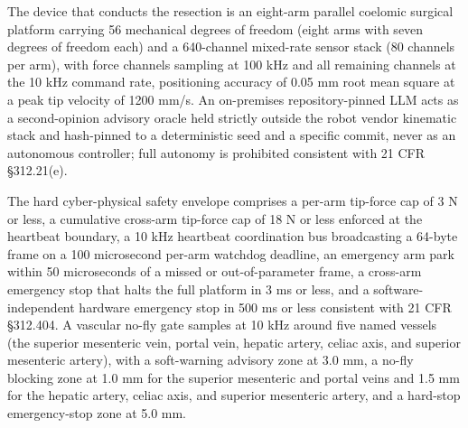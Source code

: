 The device that conducts the resection is an eight-arm parallel coelomic surgical
platform carrying 56 mechanical degrees of freedom (eight arms with seven
degrees of freedom each) and a 640-channel mixed-rate sensor stack (80 channels per
arm), with force channels sampling at 100 kHz and all remaining channels at the
10 kHz command rate, positioning accuracy of 0.05 mm root mean square at a peak tip
velocity of 1200 mm/s. An on-premises repository-pinned LLM acts as a second-opinion
advisory oracle held strictly outside the robot vendor kinematic stack and hash-pinned
to a deterministic seed and a specific commit, never as an autonomous controller;
full autonomy is prohibited consistent with 21 CFR \S 312.21(e). 

The hard
cyber-physical safety envelope comprises a per-arm tip-force cap of 3 N or less, a
cumulative cross-arm tip-force cap of 18 N or less enforced at the heartbeat
boundary, a 10 kHz heartbeat coordination bus broadcasting a 64-byte frame on a 100
microsecond per-arm watchdog deadline, an emergency arm park within 50 microseconds
of a missed or out-of-parameter frame, a cross-arm emergency stop that halts the
full platform in 3 ms or less, and a software-independent hardware emergency stop in
500 ms or less consistent with 21 CFR \S 312.404. A vascular no-fly gate samples at
10 kHz around five named vessels (the superior mesenteric vein, portal vein, hepatic
artery, celiac axis, and superior mesenteric artery), with a soft-warning advisory
zone at 3.0 mm, a no-fly blocking zone at 1.0 mm for the superior mesenteric and
portal veins and 1.5 mm for the hepatic artery, celiac axis, and superior mesenteric
artery, and a hard-stop emergency-stop zone at 5.0 mm. 

\clearpage

